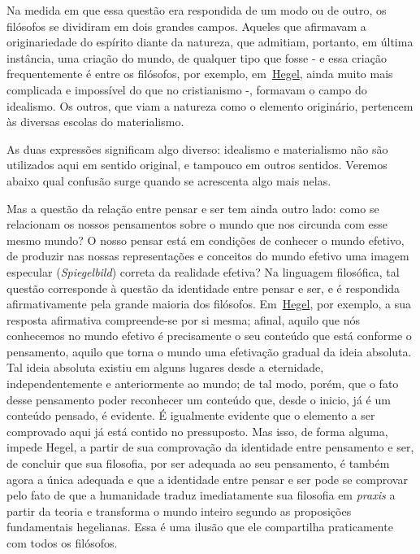 Na medida em que essa questão era respondida de um modo ou de outro, os
filósofos se dividiram em dois grandes campos. Aqueles que afirmavam a
originariedade do espírito diante da natureza, que admitiam, portanto,
em última instância, uma criação do mundo, de qualquer tipo que fosse -
e essa criação frequentemente é entre os filósofos, por exemplo,
em~\href{https://www.marxists.org/portugues/dicionario/verbetes/h/hegel.htm}{Hegel},
ainda muito mais complicada e impossível do que no cristianismo -,
formavam o campo do idealismo. Os outros, que viam a natureza como o
elemento originário, pertencem às diversas escolas do materialismo.

As duas expressões significam algo diverso: idealismo e materialismo não
são utilizados aqui em sentido original, e tampouco em outros sentidos.
Veremos abaixo qual confusão surge quando se acrescenta algo mais nelas.

Mas a questão da relação entre pensar e ser tem ainda outro lado: como
se relacionam os nossos pensamentos sobre o mundo que nos circunda com
esse mesmo mundo? O nosso pensar está em condições de conhecer o mundo
efetivo, de produzir nas nossas representações e conceitos do mundo
efetivo uma imagem especular (\emph{Spiegelbild}) correta da realidade
efetiva? Na linguagem filosófica, tal questão corresponde à questão da
identidade entre pensar e ser, e é respondida afirmativamente pela
grande maioria dos filósofos.
Em~\href{https://www.marxists.org/portugues/dicionario/verbetes/h/hegel.htm}{Hegel},
por exemplo, a sua resposta afirmativa compreende-se por si mesma;
afinal, aquilo que nós conhecemos no mundo efetivo é precisamente o seu
conteúdo que está conforme o pensamento, aquilo que torna o mundo uma
efetivação gradual da ideia absoluta. Tal ideia absoluta existiu em
alguns lugares desde a eternidade, independentemente e anteriormente ao
mundo; de tal modo, porém, que o fato desse pensamento poder reconhecer
um conteúdo que, desde o inicio, já é um conteúdo pensado, é evidente. É
igualmente evidente que o elemento a ser comprovado aqui já está contido
no pressuposto. Mas isso, de forma alguma, impede Hegel, a partir de sua
comprovação da identidade entre pensamento e ser, de concluir que sua
filosofia, por ser adequada ao seu pensamento, é também agora a única
adequada e que a identidade entre pensar e ser pode se comprovar pelo
fato de que a humanidade traduz imediatamente sua filosofia em
\emph{praxis} a partir da teoria e transforma o mundo inteiro segundo as
proposições fundamentais hegelianas. Essa é uma ilusão que ele
compartilha praticamente com todos os filósofos.

